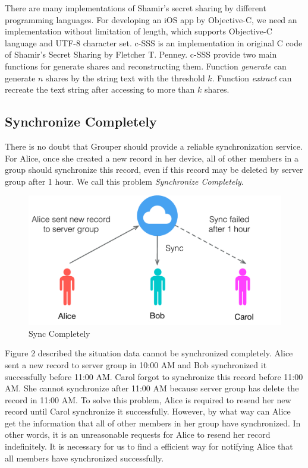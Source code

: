 \documentclass[twocolumn,10pt]{article}
\begin{document}
There are many implementations of Shamir's secret sharing by different programming languages. For developing an iOS app by Objective-C, we need an implementation without limitation of length, which supports Objective-C language and UTF-8 character set. c-SSS\cite{c-sss} is an implementation in original C code of Shamir's Secret Sharing by Fletcher T. Penney. c-SSS provide two main functions for generate shares and reconstructing them. Function \emph{generate} can generate $n$ shares by the string text with the threshold $k$. Function \emph{extract} can recreate the text string after accessing to more than $k$ shares.

\subsection{Synchronize Completely}
There is no doubt that Grouper should provide a reliable synchronization service. For Alice, once she created a new record in her device, all of other members in a group should synchronize this record, even if this record may be deleted by server group after 1 hour. We call this problem \emph{Synchronize Completely}.

\begin{figure}[t]
\centering
\includegraphics[scale=0.4]{sync_completely}
\caption{Sync Completely}
\end{figure}

Figure 2 described the situation data cannot be synchronized completely. Alice sent a new record to server group in 10:00 AM and Bob synchronized it successfully before 11:00 AM. Carol forgot to synchronize this record before 11:00 AM. She cannot synchronize after 11:00 AM because server group has delete the record in 11:00 AM. To solve this problem, Alice is required to resend her new record until Carol synchronize it successfully. However, by what way can Alice get the information that all of other members in her group have synchronized. In other words, it is an unreasonable requests for Alice to resend her record indefinitely. It is necessary for us to find a efficient way for notifying Alice that all members have synchronized successfully.
\end{document}
